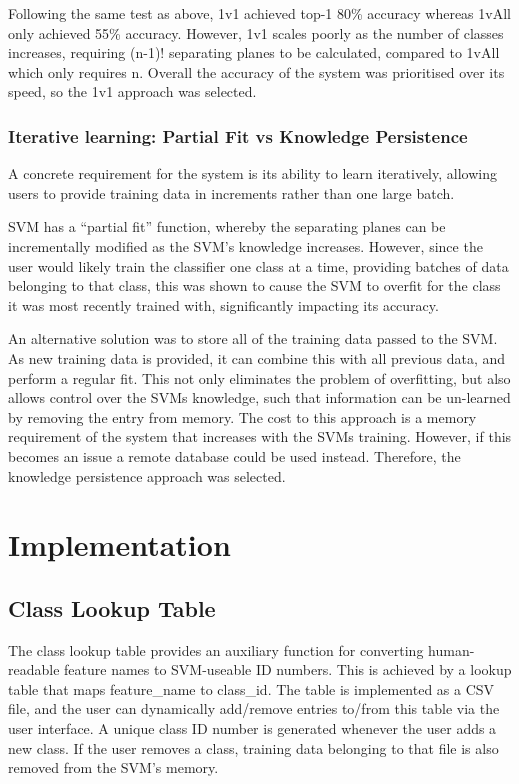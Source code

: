 Following the same test as above, 1v1 achieved top-1 80\% accuracy whereas 1vAll only achieved 55\% accuracy. 
However, 1v1 scales poorly as the number of classes increases, requiring (n-1)! separating planes to be calculated, compared to 1vAll which only requires n.
Overall the accuracy of the system was prioritised over its speed, so the 1v1 approach was selected.

\subsubsection{ Iterative learning: Partial Fit vs Knowledge Persistence}
A concrete requirement for the system is its ability to learn iteratively, allowing users to provide training data in increments rather than one large batch.

SVM has a ``partial fit” function, whereby the separating planes can be incrementally modified as the SVM’s knowledge increases. However, since the user would likely train the classifier one class at a time, providing batches of data belonging to that class, this was shown to cause the SVM to overfit for the class it was most recently trained with, significantly impacting its accuracy.

An alternative solution was to store all of the training data passed to the SVM. As new training data is provided, it can combine this with all previous data, and perform a regular fit. This not only eliminates the problem of overfitting, but also allows control over the SVMs knowledge, such that information can be un-learned by removing the entry from memory.
The cost to this approach is a memory requirement of the system that increases with the SVMs training. However, if this becomes an issue a remote database could be used instead.
Therefore, the knowledge persistence approach was selected.

\section{Implementation}
\subsection{Class Lookup Table}
The class lookup table provides an auxiliary function for converting human-readable feature names to SVM-useable ID numbers. This is achieved by a lookup table that maps feature_name to class_id. The table is implemented as a CSV file, and the user can dynamically add/remove entries to/from this table via the user interface. A unique class ID number is generated whenever the user adds a new class. If the user removes a class, training data belonging to that file is also removed from the SVM’s memory. 

